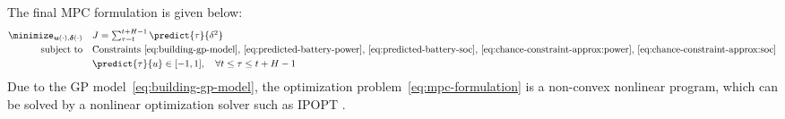 The final MPC formulation  is given below:
\begin{align}
\label{eq:mpc-formulation}
\minimize_{\boldsymbol{u}(\cdot), \boldsymbol{\delta}(\cdot)} \quad & J = \textstyle\sum_{\tau = t}^{t+H-1} \predict{\tau}{\delta^2} \\
\text{subject to} \quad & \text{Constraints \eqref{eq:building-gp-model}, \eqref{eq:predicted-battery-power}, \eqref{eq:predicted-battery-soc}, \eqref{eq:chance-constraint-approx:power}, \eqref{eq:chance-constraint-approx:soc}} \nonumber \\
& \predict{\tau}{u} \in [-1, 1], \quad \forall t \leq \tau \leq t+H-1 \nonumber
\end{align}
Due to the GP model~\eqref{eq:building-gp-model}, the optimization problem~\eqref{eq:mpc-formulation} is a non-convex nonlinear program, which can be solved by a nonlinear optimization solver such as IPOPT \cite{wachter2006implementation}.
